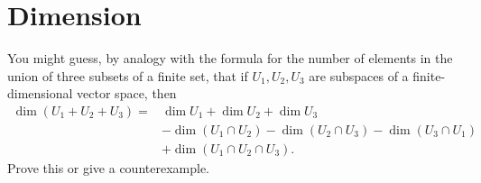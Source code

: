 \section{Dimension}

\begin{exercise}{17}
	You might guess, by analogy with the formula for the number of elements in the union of three subsets of a finite set, that if \( U_{1}, U_{2}, U_{3} \) are subspaces of a finite-dimensional vector space, then
	\begin{align*}
		\dim(U_{1} + U_{2} + U_{3}) =& \dim{U_{1}} + \dim{U_{2}} + \dim{U_{3}} \\
		                             &- \dim(U_{1} \cap U_{2}) - \dim(U_{2} \cap U_{3}) - \dim(U_{3} \cap U_{1}) \\
																 &+ \dim(U_{1} \cap U_{2} \cap U_{3}).
	\end{align*}
	Prove this or give a counterexample.
\end{exercise}
